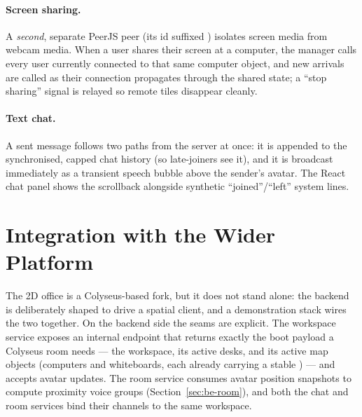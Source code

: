 \paragraph{Screen sharing.} A \emph{second}, separate PeerJS peer (its id suffixed
) isolates screen media from webcam media. When a user shares their
screen at a computer, the manager calls every user currently connected to that
same computer object, and new arrivals are called as their connection propagates
through the shared state; a ``stop sharing'' signal is relayed so remote tiles
disappear cleanly.

\paragraph{Text chat.} A sent message follows two paths from the server at once:
it is appended to the synchronised, capped chat history (so late-joiners see it),
and it is broadcast immediately as a transient speech bubble above the sender's
avatar. The React chat panel shows the scrollback alongside synthetic
``joined''/``left'' system lines.

\section{Integration with the Wider Platform}

The 2D office is a Colyseus-based fork, but it does not stand alone: the backend
is deliberately shaped to drive a spatial client, and a demonstration stack wires
the two together. On the backend side the seams are explicit. The workspace
service exposes an internal  endpoint that returns exactly
the boot payload a Colyseus room needs --- the workspace, its active desks, and
its active map objects (computers and whiteboards, each already carrying a stable
) --- and accepts avatar  updates. The room service
consumes avatar position snapshots to compute proximity voice groups
(Section~\ref{sec:be-room}), and both the chat and room services bind their
channels to the same workspace.

